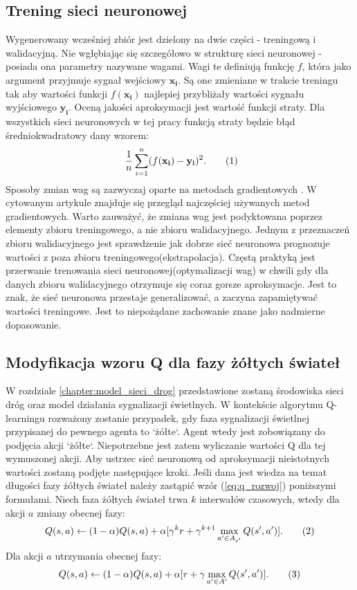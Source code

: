 \documentclass[12pt]{book}
\theoremstyle{plain}
\newcommand\addtag{\refstepcounter{equation}
\renewcommand{\labelenumii}{\theenumii}
\renewcommand{\theenumii}{\theenumi.\arabic{enumii}.}
\tag{\theequation}}
\newcommand{\myref}[1]{(\ref{#1})}
\begin{document}
\subsection{Trening sieci neuronowej}
Wygenerowany wcześniej zbiór jest dzielony na dwie części - treningową i walidacyjną. Nie wgłębiając się szczegółowo w strukturę sieci neuronowej - posiada ona parametry nazywane wagami. Wagi te definiują funkcję $f$, która jako argument przyjmuje sygnał wejściowy $\mathbf{x_{i}}$. Są one zmieniane w trakcie treningu tak aby wartości funkcji $f(\mathbf{x_i})$ najlepiej przybliżały wartości sygnału wyjściowego $\mathbf{y_i}$. Oceną jakości aproksymacji jest wartość funkcji straty. Dla wszystkich sieci neuronowych w tej pracy funkcją straty będzie błąd średniokwadratowy dany wzorem: 
\[\
\frac{1}{n}\sum_{i=1}^{n} (f(\mathbf{x_i})-\mathbf{y_i})^2. \addtag
\]
Sposoby zmian wag są zazwyczaj oparte na metodach gradientowych \cite{overview_optimizers}. W cytowanym artykule znajduje się przegląd najczęściej używanych metod gradientowych. Warto zauważyć, że zmiana wag jest podyktowana poprzez elementy zbioru treningowego, a nie zbioru walidacyjnego. Jednym z przeznaczeń zbioru walidacyjnego jest sprawdzenie jak dobrze sieć neuronowa prognozuje wartości z poza zbioru treningowego(ekstrapolacja). Częstą praktyką jest przerwanie trenowania sieci neuronowej(optymalizacji wag) w chwili gdy dla danych zbioru walidacyjnego otrzymuje się coraz gorsze aproksymacje. Jest to znak, że sieć neuronowa przestaje generalizować, a zaczyna zapamiętywać wartości treningowe. Jest to niepożądane zachowanie znane jako nadmierne dopasowanie. 
\subsection{Modyfikacja wzoru Q dla fazy żółtych świateł} \label{sec:q_mod}
W rozdziale \ref{chapter:model_sieci_drog} przedstawione zostaną środowiska sieci dróg oraz model działania sygnalizacji świetlnych. W kontekście algorytmu Q-learningu rozważony zostanie przypadek, gdy faza sygnalizacji świetlnej przypisanej do pewnego agenta to `żółte`. Agent wtedy jest zobowiązany do podjęcia akcji `żółte`. Niepotrzebne jest zatem wyliczanie wartości Q dla tej wymuszonej akcji. Aby ustrzec sieć neuronową od aproksymacji nieistotnych wartości zostaną podjęte następujące kroki. Jeśli dana jest wiedza na temat długości fazy żółtych świateł należy zastąpić wzór \myref{eq:q_rozwoj} poniższymi formułami. Niech faza żółtych świateł trwa $k$ interwałów czasowych, wtedy dla akcji $a$ zmiany obecnej fazy:
\[Q(s,a) \leftarrow  (1-\alpha)Q(s,a) + \alpha [\gamma^{k} r + \gamma^{k+1} \max_{a' \in A_{s'}} Q(s',a')]. \addtag \label{eq:Q_DQN_II} \]
Dla akcji $a$ utrzymania obecnej fazy:
\[Q(s,a) \leftarrow (1-\alpha)Q(s,a) + \alpha [r + \gamma \max_{a' \in A'} Q(s',a')]. \addtag \label{eq:Q_DQN_I} \]
\end{document}
